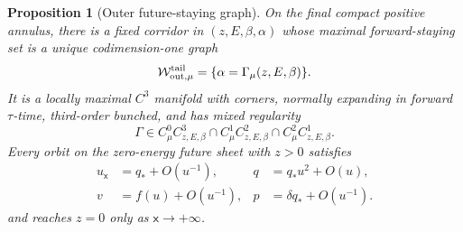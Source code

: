 \documentclass[11pt,reqno]{amsart}
\numberwithin{equation}{section}
\newtheorem{proposition}[theorem]{Proposition}
\theoremstyle{definition}
\theoremstyle{remark}
\newcommand{\cW}{\mathcal W}
\begin{document}
\begin{proposition}[Outer future-staying graph]\label{prop:outer-graph}
On the final compact positive annulus, there is a fixed corridor in
$(z,E,\beta,\alpha)$ whose maximal forward-staying set is a unique
codimension-one graph
\begin{equation}\label{eq:outer-graph}
 \cW^{\rm tail}_{\rm out,\mu}
   =\{\alpha=\Gamma_\mu(z,E,\beta)\}.
\end{equation}
It is a locally maximal $C^3$ manifold with corners, normally expanding in
forward $\tau$-time, third-order bunched, and has mixed regularity
\begin{equation}\label{eq:outer-regularity}
 \Gamma\in C^0_\mu C^3_{z,E,\beta}
  \cap C^1_\mu C^2_{z,E,\beta}
  \cap C^2_\mu C^1_{z,E,\beta}.
\end{equation}
Every orbit on the zero-energy future sheet with $z>0$ satisfies
\begin{equation}\label{eq:outer-asymptotics}
 \begin{aligned}
  u_{\mathsf x}&=q_*+O(u^{-1}),&
  q&=q_*u^2+O(u),\\
  v&=f(u)+O(u^{-1}),&
  p&=\delta q_*+O(u^{-1}).
 \end{aligned}
\end{equation}
and reaches $z=0$ only as $\mathsf x\to+\infty$.
\end{proposition}
\end{document}
